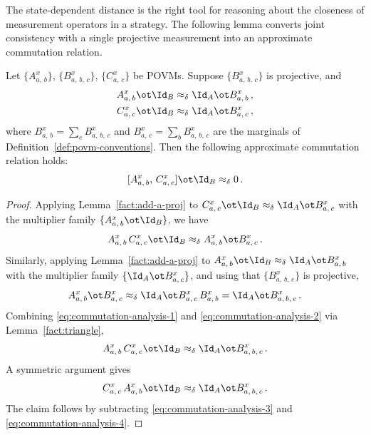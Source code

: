 The state-dependent distance is the right tool for reasoning about the closeness of measurement operators in a strategy. The following lemma converts joint consistency with a single projective measurement into an approximate commutation relation.

\begin{lemma}\label{lem:commutation-analysis}
	\leanok
	Let $\{A^x_{a,\,b}\}$, $\{B^x_{a,\,b,\,c}\}$, $\{C^x_{a,\,c}\}$ be POVMs. Suppose $\{B^x_{a,\,b,\,c}\}$ is projective, and
	\begin{align*}
		A^x_{a,\,b} \ot \Id_B &\approx_\delta \Id_A \ot B^x_{a,\,b}\,,\\
		C^x_{a,\,c} \ot \Id_B &\approx_\delta \Id_A \ot B^x_{a,\,c}\,,
	\end{align*}
	where $B^x_{a,\,b} = \sum_c B^x_{a,\,b,\,c}$ and $B^x_{a,\,c} = \sum_b B^x_{a,\,b,\,c}$ are the marginals of Definition~\ref{def:povm-conventions}. Then the following approximate commutation relation holds:
	\[
		[A^x_{a,\,b},\, C^x_{a,\,c}] \ot \Id_B \approx_\delta 0\,.
	\]
\end{lemma}
\begin{proof}
	\leanok
	Applying Lemma~\ref{fact:add-a-proj} to $C^x_{a,\,c} \ot \Id_B \approx_\delta \Id_A \ot B^x_{a,\,c}$ with the multiplier family $\{A^x_{a,\,b} \ot \Id_B\}$, we have
	\begin{equation}\label{eq:commutation-analysis-1}
		A^x_{a,\,b}\, C^x_{a,\,c} \ot \Id_B \approx_\delta A^x_{a,\,b} \ot B^x_{a,\,c}\,.
	\end{equation}
	Similarly, applying Lemma~\ref{fact:add-a-proj} to $A^x_{a,\,b} \ot \Id_B \approx_\delta \Id_A \ot B^x_{a,\,b}$ with the multiplier family $\{\Id_A \ot B^x_{a,\,c}\}$, and using that $\{B^x_{a,\,b,\,c}\}$ is projective,
	\begin{equation}\label{eq:commutation-analysis-2}
		A^x_{a,\,b} \ot B^x_{a,\,c} \approx_\delta \Id_A \ot B^x_{a,\,c}\, B^x_{a,\,b} = \Id_A \ot B^x_{a,\,b,\,c}\,.
	\end{equation}
	Combining \eqref{eq:commutation-analysis-1} and \eqref{eq:commutation-analysis-2} via Lemma~\ref{fact:triangle},
	\begin{equation}\label{eq:commutation-analysis-3}
		A^x_{a,\,b}\, C^x_{a,\,c} \ot \Id_B \approx_\delta \Id_A \ot B^x_{a,\,b,\,c}\,.
	\end{equation}
	A symmetric argument gives
	\begin{equation}\label{eq:commutation-analysis-4}
		C^x_{a,\,c}\, A^x_{a,\,b} \ot \Id_B \approx_\delta \Id_A \ot B^x_{a,\,b,\,c}\,.
	\end{equation}
	The claim follows by subtracting \eqref{eq:commutation-analysis-3} and \eqref{eq:commutation-analysis-4}.
\end{proof}

